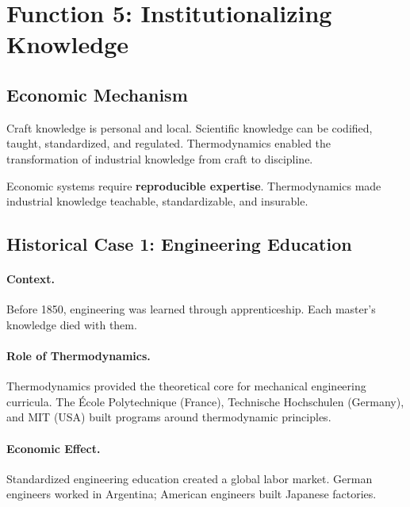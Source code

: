\section{Function 5: Institutionalizing Knowledge}
\label{sec:thermo-institutionalization}

\subsection{Economic Mechanism}

Craft knowledge is personal and local. Scientific knowledge can be codified,
taught, standardized, and regulated. Thermodynamics enabled the transformation
of industrial knowledge from craft to discipline.

\begin{tcolorbox}[colback=yellow!5!white, colframe=yellow!75!black,
    title=Core Insight: Knowledge Institutionalization]
Economic systems require \textbf{reproducible expertise}. Thermodynamics made
industrial knowledge teachable, standardizable, and insurable.
\end{tcolorbox}

\subsection{Historical Case 1: Engineering Education}

\paragraph{Context.} Before 1850, engineering was learned through apprenticeship.
Each master's knowledge died with them.

\paragraph{Role of Thermodynamics.} Thermodynamics provided the theoretical
core for mechanical engineering curricula. The École Polytechnique (France),
Technische Hochschulen (Germany), and MIT (USA) built programs around
thermodynamic principles.

\paragraph{Economic Effect.} Standardized engineering education created a
global labor market. German engineers worked in Argentina; American
engineers built Japanese factories.

